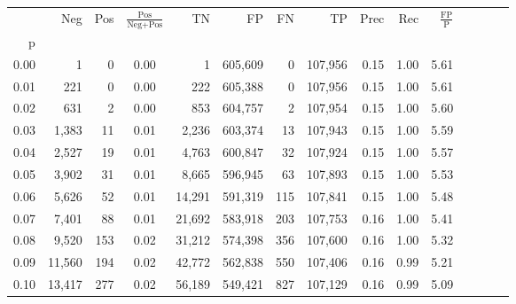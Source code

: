 \begin{tabular}{rrrcrrrrrrrrrrr}
\toprule
{} &     Neg &    Pos & $\frac{\text{Pos}}{\text{Neg}+\text{Pos}}$ &       TN &       FP &       FN &       TP &  Prec &   Rec & $\frac{\text{FP}}{\text{P}}$ \\
p    &         &        &                                            &          &          &          &          &       &       &                              \\
\midrule
0.00 &       1 &      0 &                                       0.00 &        1 &  605,609 &        0 &  107,956 &  0.15 &  1.00 &                         5.61 \\
0.01 &     221 &      0 &                                       0.00 &      222 &  605,388 &        0 &  107,956 &  0.15 &  1.00 &                         5.61 \\
0.02 &     631 &      2 &                                       0.00 &      853 &  604,757 &        2 &  107,954 &  0.15 &  1.00 &                         5.60 \\
0.03 &   1,383 &     11 &                                       0.01 &    2,236 &  603,374 &       13 &  107,943 &  0.15 &  1.00 &                         5.59 \\
0.04 &   2,527 &     19 &                                       0.01 &    4,763 &  600,847 &       32 &  107,924 &  0.15 &  1.00 &                         5.57 \\
0.05 &   3,902 &     31 &                                       0.01 &    8,665 &  596,945 &       63 &  107,893 &  0.15 &  1.00 &                         5.53 \\
0.06 &   5,626 &     52 &                                       0.01 &   14,291 &  591,319 &      115 &  107,841 &  0.15 &  1.00 &                         5.48 \\
0.07 &   7,401 &     88 &                                       0.01 &   21,692 &  583,918 &      203 &  107,753 &  0.16 &  1.00 &                         5.41 \\
0.08 &   9,520 &    153 &                                       0.02 &   31,212 &  574,398 &      356 &  107,600 &  0.16 &  1.00 &                         5.32 \\
0.09 &  11,560 &    194 &                                       0.02 &   42,772 &  562,838 &      550 &  107,406 &  0.16 &  0.99 &                         5.21 \\
0.10 &  13,417 &    277 &                                       0.02 &   56,189 &  549,421 &      827 &  107,129 &  0.16 &  0.99 &                         5.09 \\

\end{tabular}
